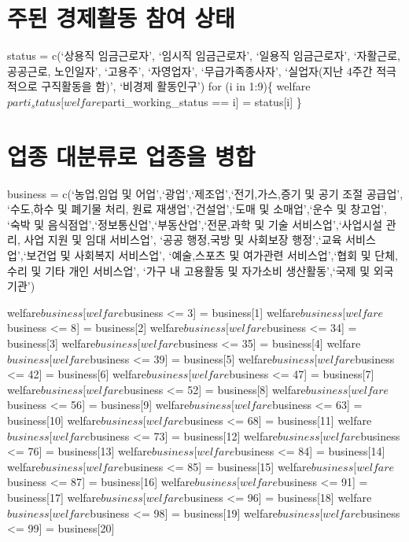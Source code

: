 \documentclass[
]{article}
\begin{document}
\hypertarget{uxc8fcuxb41c-uxacbduxc81cuxd65cuxb3d9-uxcc38uxc5ec-uxc0c1uxd0dc}{%
\section{주된 경제활동 참여
상태}\label{uxc8fcuxb41c-uxacbduxc81cuxd65cuxb3d9-uxcc38uxc5ec-uxc0c1uxd0dc}}

status = c(`상용직 임금근로자', `임시직 임금근로자', `일용직
임금근로자', `자활근로, 공공근로, 노인일자', `고용주', `자영업자',
`무급가족종사자', `실업자(지난 4주간 적극적으로 구직활동을 함)', `비경제
활동인구') for (i in 1:9)\{
welfare\(parti_status[welfare\)parti\_working\_status == i{]} =
status{[}i{]} \}

\hypertarget{uxc5c5uxc885-uxb300uxbd84uxb958uxb85c-uxc5c5uxc885uxc744-uxbcd1uxd569}{%
\section{업종 대분류로 업종을
병합}\label{uxc5c5uxc885-uxb300uxbd84uxb958uxb85c-uxc5c5uxc885uxc744-uxbcd1uxd569}}

business = c(`농업,임업 및 어업',`광업',`제조업',`전기,가스,증기 및 공기
조절 공급업', `수도,하수 및 폐기물 처리, 원료 재생업',`건설업',`도매 및
소매업',`운수 및 창고업', `숙박 및
음식점업',`정보통신업',`부동산업',`전문,과학 및 기술 서비스업',`사업시설
관리, 사업 지원 및 임대 서비스업', `공공 행정,국방 및 사회보장
행정',`교육 서비스업',`보건업 및 사회복지 서비스업', `예술,스포츠 및
여가관련 서비스업',`협회 및 단체, 수리 및 기타 개인 서비스업', `가구 내
고용활동 및 자가소비 생산활동',`국제 및 외국기관')

welfare\(business[welfare\)business \textless= 3{]} = business{[}1{]}
welfare\(business[welfare\)business \textless= 8{]} = business{[}2{]}
welfare\(business[welfare\)business \textless= 34{]} = business{[}3{]}
welfare\(business[welfare\)business \textless= 35{]} = business{[}4{]}
welfare\(business[welfare\)business \textless= 39{]} = business{[}5{]}
welfare\(business[welfare\)business \textless= 42{]} = business{[}6{]}
welfare\(business[welfare\)business \textless= 47{]} = business{[}7{]}
welfare\(business[welfare\)business \textless= 52{]} = business{[}8{]}
welfare\(business[welfare\)business \textless= 56{]} = business{[}9{]}
welfare\(business[welfare\)business \textless= 63{]} = business{[}10{]}
welfare\(business[welfare\)business \textless= 68{]} = business{[}11{]}
welfare\(business[welfare\)business \textless= 73{]} = business{[}12{]}
welfare\(business[welfare\)business \textless= 76{]} = business{[}13{]}
welfare\(business[welfare\)business \textless= 84{]} = business{[}14{]}
welfare\(business[welfare\)business \textless= 85{]} = business{[}15{]}
welfare\(business[welfare\)business \textless= 87{]} = business{[}16{]}
welfare\(business[welfare\)business \textless= 91{]} = business{[}17{]}
welfare\(business[welfare\)business \textless= 96{]} = business{[}18{]}
welfare\(business[welfare\)business \textless= 98{]} = business{[}19{]}
welfare\(business[welfare\)business \textless= 99{]} = business{[}20{]}
\end{document}
